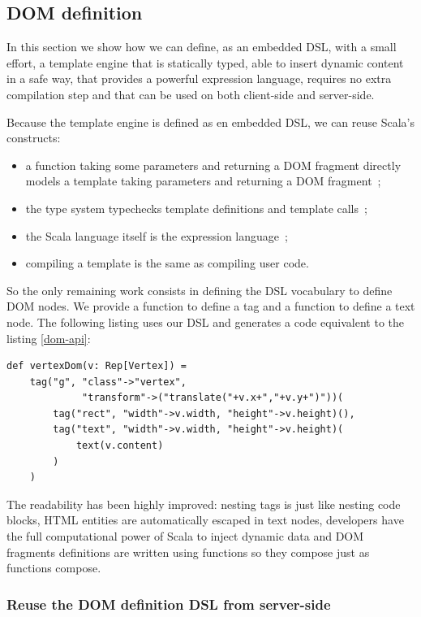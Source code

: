 \documentclass[american,english,runningheads]{llncs}
\begin{document}
\subsection{DOM definition}

In this section we show how we can define, as an embedded DSL, with a small effort, a template engine that is statically typed, able to insert dynamic content in a safe way, that provides a powerful expression language, requires no extra compilation step and that can be used on both client-side and server-side.

Because the template engine is defined as en embedded DSL, we can reuse Scala’s constructs:

\begin{itemize}
\item a function taking some parameters and returning a DOM fragment directly models a template taking parameters and returning a DOM fragment~;
\item the type system typechecks template definitions and template calls~;
\item the Scala language itself is the expression language~;
\item compiling a template is the same as compiling user code.
\end{itemize}

So the only remaining work consists in defining the DSL vocabulary to define DOM nodes. We provide a  function to define a tag and a  function to define a text node. The following listing uses our DSL and generates a code equivalent to the listing \ref{dom-api}:

\begin{lstlisting}[label=forest-hello,caption=DOM definition DSL]
def vertexDom(v: Rep[Vertex]) =
    tag("g", "class"->"vertex",
             "transform"->("translate("+v.x+","+v.y+")"))(
        tag("rect", "width"->v.width, "height"->v.height)(),
        tag("text", "width"->v.width, "height"->v.height)(
            text(v.content)
        )
    )
\end{lstlisting}

The readability has been highly improved: nesting tags is just like nesting code blocks, HTML entities are automatically escaped in text nodes, developers have the full computational power of Scala to inject dynamic data and DOM fragments definitions are written using functions so they compose just as functions compose.

\subsubsection{Reuse the DOM definition DSL from server-side}
\end{document}
